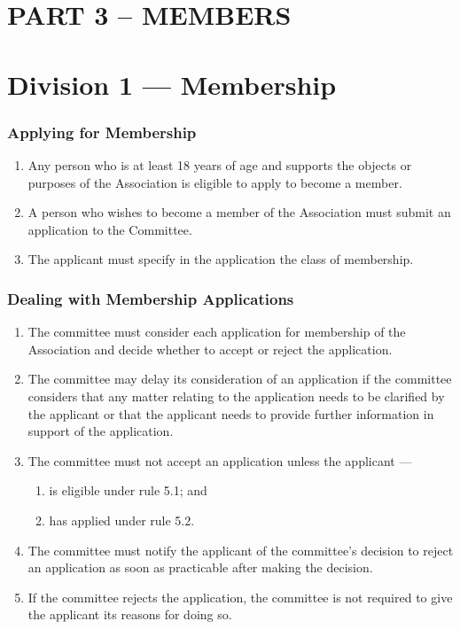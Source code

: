 \hypertarget{part-3-members}{%
\part{PART 3 -- MEMBERS}\label{part-3-members}}

\hypertarget{division-1-membership}{%
\part*{Division 1 --- Membership}\label{division-1-membership}}

\hypertarget{applying-for-membership}{%
\section{Applying for Membership}\label{applying-for-membership}}

\begin{enumerate}

\item Any person who is at least 18 years of age and supports the objects or purposes of the Association is eligible to apply to become a member.
\item A person who wishes to become a member of the Association must submit an application to the Committee.
\item The applicant must specify in the application the class of membership.
\end{enumerate}

\hypertarget{dealing-with-membership-applications}{%
\section{Dealing with Membership Applications}\label{dealing-with-membership-applications}}

\begin{enumerate}

\item The committee must consider each application for membership of the Association and decide whether to accept or reject the application.
\item The committee may delay its consideration of an application if the committee considers that any matter relating to the application needs to be clarified by the applicant or that the applicant needs to provide further information in support of the application.
\item The committee must not accept an application unless the applicant ---

  \begin{enumerate}
  
  \item is eligible under rule 5.1; and
  \item has applied under rule 5.2.
  \end{enumerate}
\item The committee must notify the applicant of the committee's decision to reject an application as soon as practicable after making the decision.
\item If the committee rejects the application, the committee is not required to give the applicant its reasons for doing so.
\end{enumerate}

